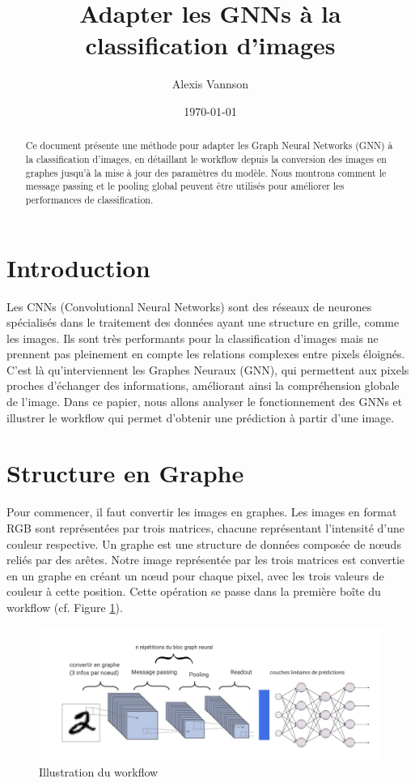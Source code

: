 \documentclass{article}
\begin{document}
\title{Adapter les GNNs à la classification d'images}
\author{Alexis Vannson}
\date{\today}
\maketitle

\begin{abstract}
Ce document présente une méthode pour adapter les Graph Neural Networks (GNN) à la classification d'images, en détaillant le workflow depuis la conversion des images en graphes jusqu'à la mise à jour des paramètres du modèle. Nous montrons comment le message passing et le pooling global peuvent être utilisés pour améliorer les performances de classification.
\end{abstract}

\tableofcontents
\newpage

\section*{Introduction}
Les CNNs (Convolutional Neural Networks) sont des réseaux de neurones spécialisés dans le traitement des données ayant une structure en grille, comme les images. Ils sont très performants pour la classification d'images mais ne prennent pas pleinement en compte les relations complexes entre pixels éloignés. C'est là qu'interviennent les Graphes Neuraux (GNN), qui permettent aux pixels proches d'échanger des informations, améliorant ainsi la compréhension globale de l'image. Dans ce papier, nous allons analyser le fonctionnement des GNNs et illustrer le workflow qui permet d'obtenir une prédiction à partir d'une image.

\section{Structure en Graphe}
Pour commencer, il faut convertir les images en graphes. Les images en format RGB sont représentées par trois matrices, chacune représentant l'intensité d'une couleur respective. Un graphe est une structure de données composée de nœuds reliés par des arêtes. Notre image représentée par les trois matrices est convertie en un graphe en créant un nœud pour chaque pixel, avec les trois valeurs de couleur à cette position. Cette opération se passe dans la première boîte du workflow (cf. Figure \ref{fig:workflow}).

\begin{figure}[h]
    \centering
    \includegraphics[width=1.2\textwidth]{workflow2.png}
    \caption{Illustration du workflow}
    \label{fig:workflow}
\end{figure}
\end{document}
